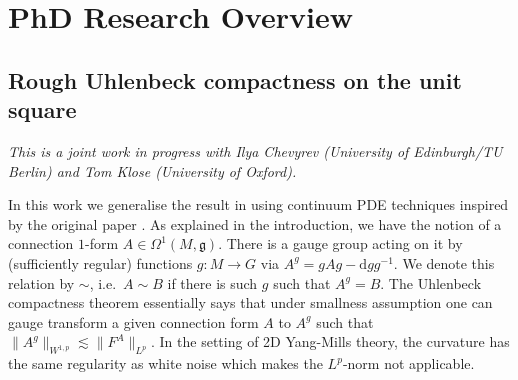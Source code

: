 \documentclass[12pt]{article}
\numberwithin{equation}{section}
\theoremstyle{definition}
\theoremstyle{remark}
\newcommand{\diff}{\mathrm{d}}
\newcommand{\1}{\mathbf 1}
\newcommand{\<}{\langle}
\renewcommand{\>}{\rangle}
\begin{document}

\section{PhD Research Overview}


\subsection{Rough Uhlenbeck compactness on the unit square}\label{sec:RUC_square}
\textit{This is a joint work in progress with Ilya Chevyrev (University of Edinburgh/TU Berlin) and Tom Klose (University of Oxford).}

\medskip

\noindent In this work we generalise the result in \cite{Chevyrev19} using continuum PDE techniques inspired by the original paper \cite{Uhlenbeck82}. As explained in the introduction, we have the notion of a connection $1$-form $A\in\Omega^1(M,\mathfrak g)$. There is a gauge group acting on it by (sufficiently regular) functions $g:M\to G$ via $A^g=gAg-\diff gg^{-1}$. We denote this relation by $\sim$, i.e.\ $A\sim B$ if there is such $g$ such that $A^g=B$.  The Uhlenbeck compactness theorem essentially says that under smallness assumption one can gauge transform a given connection form $A$ to $A^g$ such that 
$
\|A^g\|_{W^{1,p}}\lesssim \|F^A\|_{L^p}.
$
In the setting of 2D Yang-Mills theory, the curvature has the same regularity as white noise which makes the $L^p$-norm not applicable. %
\end{document}
